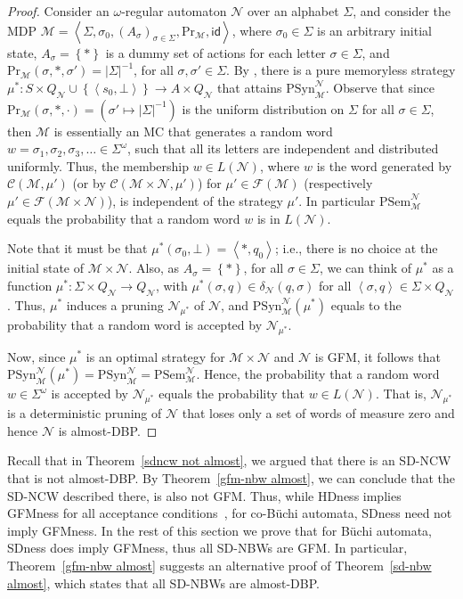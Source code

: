 \documentclass[10pt,a4paper]{amsart}
\theoremstyle{definition}
\numberwithin{equation}{section}
\newcommand{\set}[1]{\{ #1 \}}
\newcommand{\buchi}{B\"uchi\xspace}
\newcommand{\C}{{\mathcal C}}
\newcommand{\M}{{\mathcal M}}
\newcommand{\F}{{\mathcal F}}
\newcommand{\zug}[1]{\left\langle #1 \right\rangle}
\renewcommand{\set}[1]{\left\{ #1 \right\}}
\renewcommand{\Pr}{\mathrm{Pr}}
\newcommand{\N}{{\mathcal N}}
\begin{document}
\begin{proof}
	Consider an $\omega$-regular automaton $\N$ over an alphabet $\Sigma$, and consider the MDP $\M=\zug{\Sigma,\sigma_0,(A_\sigma)_{\sigma\in\Sigma},\Pr_{\M},\mathsf{id}}$, where $\sigma_0\in \Sigma$ is an arbitrary initial state, $A_\sigma=\set{\ast}$ is a dummy set of actions for each letter $\sigma\in \Sigma$, and $\Pr_{\M}(\sigma,\ast,\sigma')=|\Sigma|^{-1}$, for all $\sigma,\sigma'\in\Sigma$. By \cite{CJH03}, there is a pure memoryless strategy $\mu^*:S\times Q_\N\cup\set{\zug{s_0,\bot}}\rightarrow A\times Q_\N$ that attains $\mathrm{PSyn}^\N_\M$. Observe that since $\Pr_{\M}(\sigma,\ast,\cdot)=(\sigma'\mapsto |\Sigma|^{-1})$ is the uniform distribution on $\Sigma$ for all $\sigma\in \Sigma$, then $\M$ is essentially an MC that generates a random word $w=\sigma_1,\sigma_2,\sigma_3,\ldots\in \Sigma^\omega$, such that all its letters are independent and distributed uniformly. Thus, the membership $w\in L(\N)$, where $w$ is the word generated by $\C(\M,\mu')$ (or by $\C(\M\times \N,\mu')$) for $\mu'\in \F(\M)$ (respectively $\mu'\in \F(\M\times \N)$), is independent of the strategy $\mu'$. In particular $\mathrm{PSem}^\N_\M$ equals the probability that a random word $w$ is in $L(\N)$. 
	
	Note that it must be that $\mu^*(\sigma_0,\bot)=\zug{\ast,q_0}$; i.e., there is no choice at the initial state of $\M\times \N$. Also, as $A_\sigma=\set{\ast}$, for all $\sigma\in \Sigma$, we can think of $\mu^*$ as a function $\mu^*:\Sigma\times Q_\N\rightarrow Q_\N$, with $\mu^*(\sigma,q)\in \delta_\N(q,\sigma)$ for all $\zug{\sigma,q}\in \Sigma\times Q_\N$. Thus, $\mu^*$ induces a pruning $\N_{\mu^*}$ of $\N$, and $\mathrm{PSyn}^\N_\M(\mu^*)$ equals to the probability that a random word is accepted by $\N_{\mu^*}$. 
	
	Now, since $\mu^*$ is an optimal strategy for $\M\times \N$ and $\N$ is GFM, it follows that $\mathrm{PSyn}^\N_\M(\mu^*)=\mathrm{PSyn}^\N_\M=\mathrm{PSem}^\N_\M$. Hence, the probability that a random word $w\in \Sigma^\omega$ is accepted by $\N_{\mu^*}$ equals the probability that $w\in L(\N)$. That is, $\N_{\mu^*}$ is a deterministic pruning of $\N$ that loses only a set of words of measure zero and hence $\N$ is almost-DBP.
\end{proof}

Recall that in Theorem~\ref{sdncw not almost}, we argued that there is an SD-NCW that is not almost-DBP. By Theorem~\ref{gfm-nbw almost}, we can conclude that the SD-NCW described there, is also not GFM. 
Thus, while HDness implies GFMness for all acceptance conditions~\cite{KMBK14}, for co-\buchi automata, SDness need not imply GFMness. 
In the rest of this section we prove that for \buchi automata, SDness does imply GFMness, thus all SD-NBWs are GFM. In particular, Theorem~\ref{gfm-nbw almost} suggests an alternative proof of Theorem~\ref{sd-nbw almost}, which states that all SD-NBWs are almost-DBP.
\end{document}

